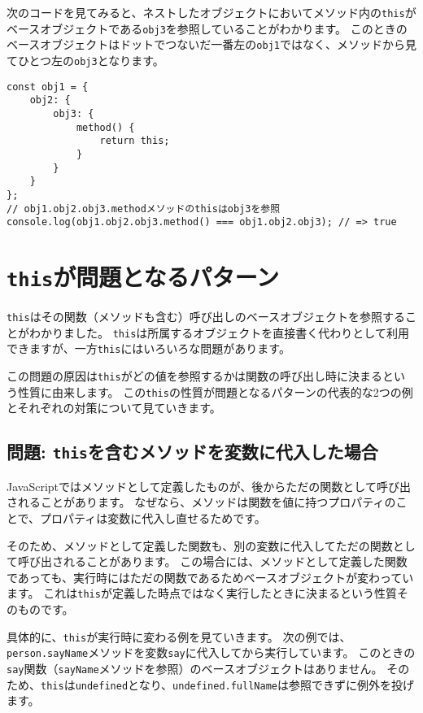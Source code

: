 次のコードを見てみると、ネストしたオブジェクトにおいてメソッド内の\texttt{this}がベースオブジェクトである\texttt{obj3}を参照していることがわかります。
このときのベースオブジェクトはドットでつないだ一番左の\texttt{obj1}ではなく、メソッドから見てひとつ左の\texttt{obj3}となります。

\begin{lstlisting}
const obj1 = {
    obj2: {
        obj3: {
            method() {
                return this;
            }
        }
    }
};
// obj1.obj2.obj3.methodメソッドのthisはobj3を参照
console.log(obj1.obj2.obj3.method() === obj1.obj2.obj3); // => true
\end{lstlisting}

\hypertarget{this-problem}{%
\section{\texorpdfstring{\texttt{this}が問題となるパターン}{thisが問題となるパターン}}\label{this-problem}}

\texttt{this}はその関数（メソッドも含む）呼び出しのベースオブジェクトを参照することがわかりました。
\texttt{this}は所属するオブジェクトを直接書く代わりとして利用できますが、一方\texttt{this}にはいろいろな問題があります。

この問題の原因は\texttt{this}がどの値を参照するかは関数の呼び出し時に決まるという性質に由来します。
この\texttt{this}の性質が問題となるパターンの代表的な2つの例とそれぞれの対策について見ていきます。

\hypertarget{assign-this-function}{%
\subsection{\texorpdfstring{問題:
\texttt{this}を含むメソッドを変数に代入した場合}{問題: thisを含むメソッドを変数に代入した場合}}\label{assign-this-function}}

JavaScriptではメソッドとして定義したものが、後からただの関数として呼び出されることがあります。
なぜなら、メソッドは関数を値に持つプロパティのことで、プロパティは変数に代入し直せるためです。

そのため、メソッドとして定義した関数も、別の変数に代入してただの関数として呼び出されることがあります。
この場合には、メソッドとして定義した関数であっても、実行時にはただの関数であるためベースオブジェクトが変わっています。
これは\texttt{this}が定義した時点ではなく実行したときに決まるという性質そのものです。

具体的に、\texttt{this}が実行時に変わる例を見ていきます。
次の例では、\texttt{person.sayName}メソッドを変数\texttt{say}に代入してから実行しています。
このときの\texttt{say}関数（\texttt{sayName}メソッドを参照）のベースオブジェクトはありません。
そのため、\texttt{this}は\texttt{undefined}となり、\texttt{undefined.fullName}は参照できずに例外を投げます。

